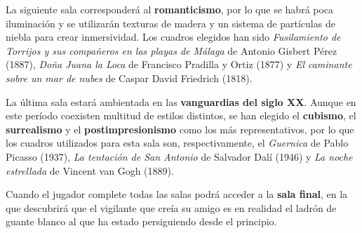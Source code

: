 La siguiente sala corresponderá al \textbf{romanticismo}, por lo que se habrá poca iluminación y se utilizarán texturas de madera y un sistema de partículas de niebla para crear inmersividad. Los cuadros elegidos han sido \textit{Fusilamiento de Torrijos y sus compañeros en las playas de Málaga} de Antonio Gisbert Pérez (1887), \textit{Doña Juana la Loca} de Francisco Pradilla y Ortiz (1877) y \textit{El caminante sobre un mar de nubes} de Caspar David Friedrich (1818).

La última sala estará ambientada en las \textbf{vanguardias del siglo XX}. Aunque en este período coexisten multitud de estilos distintos, se han elegido el \textbf{cubismo}, el \textbf{surrealismo} y el \textbf{postimpresionismo} como los más representativos, por lo que los cuadros utilizados para esta sala son, respectivamente, el \textit{Guernica} de Pablo Picasso (1937), \textit{La tentación de San Antonio} de Salvador Dalí (1946) y \textit{La noche estrellada} de Vincent van Gogh (1889).

Cuando el jugador complete todas las salas podrá acceder a la \textbf{sala final}, en la que descubrirá que el vigilante que creía su amigo es en realidad el ladrón de guante blanco al que ha estado persiguiendo desde el principio.
